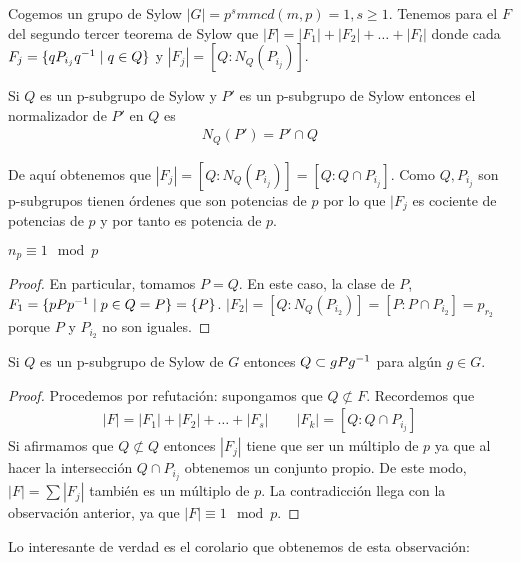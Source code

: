 


Cogemos un grupo de Sylow $|G| = p^sm mcd(m,p) = 1, s \geq 1$. Tenemos para el $F$ del segundo tercer teorema de Sylow que $|F| = |F_1| + |F_2| + \dots + |F_l|$ donde cada $F_j = \{qP_{i_j}q^{-1} \mid q \in Q\}$ y $|F_j| = [Q:N_Q(P_{i_j})]$.

\begin{pro}
	Si $Q$ es un p-subgrupo de Sylow y $P'$ es un p-subgrupo de Sylow entonces el normalizador de $P'$ en $Q$ es
	\begin{align*}
		N_Q(P') = P' \cap Q
	\end{align*}
\end{pro}

De aquí obtenemos que $|F_j| = [Q:N_Q(P_{i_j})] = [Q:Q \cap P_{i_j}]$. Como $Q, P_{i_j}$ son p-subgrupos tienen órdenes que son potencias de $p$ por lo que $|F_j$ es cociente de potencias de $p$ y por tanto es potencia de $p$.

\begin{obs}
	$n_p \equiv 1 \mod p$
\end{obs}

\begin{proof}
	En particular, tomamos $P = Q$. En este caso, la clase de $P$, $F_1 = \{pPp^{-1} \mid p \in Q = P\} = \{P\}$. $|F_2| = [Q:N_Q(P_{i_2})] = [P:P \cap P_{i_2}] = p_{r_2}$ porque $P$ y $P_{i_2}$ no son iguales.
\end{proof}

\begin{obs}Si $Q$ es un p-subgrupo de Sylow de $G$ entonces $Q \subset gPg^{-1}$ para algún $g \in G$.
\end{obs}

\begin{proof}
	Procedemos por refutación: supongamos que $Q \not \subset F$. Recordemos que 
	\begin{align*}
		|F| = |F_1| + |F_2| + \dots + |F_s| \qquad |F_k| = [Q:Q\cap P_{i_j}]
	\end{align*}
	Si afirmamos que $Q \not \subset Q$ entonces $|F_j|$ tiene que ser un múltiplo de $p$ ya que al hacer la intersección $Q \cap P_{i_j}$ obtenemos un conjunto propio. De este modo, $|F| = \sum |F_j|$ también es un múltiplo de $p$. La contradicción llega con la observación anterior, ya que $|F| \equiv 1 \mod p$.
\end{proof}

Lo interesante de verdad es el corolario que obtenemos de esta observación:

